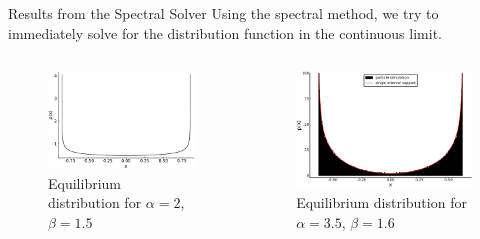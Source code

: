 \documentclass[aspectratio=169, hyperref={colorlinks=true}]{beamer}
\begin{document}
  \begin{frame}{Results from the Spectral Solver}
    Using the spectral method, we try to immediately solve for the distribution function in the continuous limit.

    \begin{columns}
      \begin{column}{0.5\textwidth}
        \begin{figure}[H]
          \centering
          \includegraphics[width=\linewidth]{figures/a2b1-5-measure.pdf}
          \caption*{Equilibrium distribution for $\alpha = 2$, $\beta = 1.5$}
        \end{figure}
      \end{column}
      \begin{column}{0.5\textwidth}
        \begin{figure}[H]
          \centering
          \includegraphics[width=\linewidth]{figures/a35b16_supplement_3k.pdf}
          \caption*{Equilibrium distribution for $\alpha = 3.5$, $\beta = 1.6$}
        \end{figure}
      \end{column}
    \end{columns}
  \end{frame}
\end{document}
